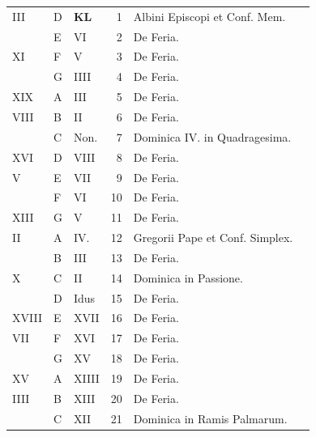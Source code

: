 \begin{center}
\begin{tabular}{l | l | l | r | l l}
\color{Red} III & D & \textbf{\color{Red} K\color{Blue}L} & 1 & \color{Red} Albini Episcopi et Conf. Mem. \\
\color{Red}  & E & \color{Red} VI & 2 & De Feria. & \color{Red} \\
\color{Red} XI & F & \color{Red} V & 3 & De Feria. \\
\color{Red}  & G & \color{Red} IIII & 4 & De Feria. & \color{Red} \\
\color{Red} XIX & \color{Red} A & \color{Red} III & 5 & De Feria. & \\
\color{Red} VIII & B & \color{Red} II & 6 & De Feria. \\
\color{Red}  & C & \color{Red} Non. & 7 & \color{Red} Dominica IV. in Quadragesima. \\
\color{Red} XVI & D & \color{Red} VIII & 8 & De Feria. & \color{Red} \\
\color{Red} V & E & \color{Red} VII & 9 & De Feria. & \color{Red} \\
\color{Red}  & F & \color{Red} VI & 10 & De Feria. & \color{Red} \\
\color{Red} XIII & G & \color{Red} V & 11 & De Feria. \\
\color{Red} II & \color{Red} A & \color{Red} IV. & 12 & \color{Red} Gregorii Pape et Conf. Simplex. \\
\color{Red}  & B & \color{Red} III & 13 & De Feria. & \color{Red} \\
\color{Red} X & C & \color{Red} II & 14 & \color{Red} Dominica in Passione. \\
\color{Red}  & D & \color{Red} Idus & 15 & De Feria. \\
\color{Red} XVIII & E & \color{Red} XVII & 16 & De Feria. \\
\color{Red} VII & F & \color{Red} XVI & 17 & De Feria. & \color{Red} \\
\color{Red}  & G & \color{Red} XV & 18 & De Feria. \\
\color{Red} XV & \color{Red} A & \color{Red} XIIII & 19 & De Feria. & \color{Red} \\
\color{Red} IIII & B & \color{Red} XIII & 20 & De Feria. & \color{Red} \\
\color{Red}  & C & \color{Red} XII & 21 & \color{Red} Dominica in Ramis Palmarum. \\

\end{tabular}
\end{center}
